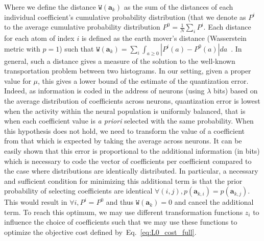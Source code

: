 \documentclass[vision,article,submit,oneauthor,pdftex]{Definitions/mdpi}
\newcommand{\coef}{\mathbf{a}} %
\newcommand{\image}{\mathbf{y}} %
\newcommand{\seeEq}[1]{Eq.~\ref{eq:#1}}%
\begin{document}
{Where we define the distance $\texttt{W}(\coef_{k})$ as the sum of the distances of each individual coefficient's cumulative probability distribution (that we denote as $P^i$ to the average cumulative probability distribution $P^0 = \frac 1 N \sum_i P^i$. Each distance for each atom of index $i$ is defined as the earth mover's distance (Wasserstein metric with $p=1$) such that  $ \texttt{W}(\coef_{k}) = \sum_i \int_{a\geq0} | P^i(a) - P^0(a)| da $~\citep{Vallender74}. In general, such a distance gives a measure of the solution to the well-known transportation problem between two histograms. In our setting, given a proper value for $\mu$, this gives a lower bound of the estimate of the quantization error.  Indeed, as information is coded in the address of neurons (using $\lambda$ bits) based on the average distribution of coefficients across neurons, quantization error is lowest when the activity within the neural population is uniformly balanced, that is when each coefficient value is \emph{a priori} selected with the same probability. When this hypothesis does not hold, we need to transform the value of a coefficient from that which is expected by taking the average across neurons. It can be easily shown that this error is proportional to the additional information (in bits) which is necessary to code the vector of coefficients per coefficient compared to the case where distributions are identically distributed. In particular, a necessary and sufficient condition for minimizing this additional term is that the prior probability of selecting coefficients are identical $\forall (i,j), p(\coef_{k,i})=p(\coef_{k,j})$. This would result in $\forall i, P^i = P^0$ and thus $\texttt{W}(\coef_{k})= 0$ and cancel the additional term. To reach this optimum, we may use different transformation functions $z_i$ to influence the choice of coefficients such that we may use these functions to optimize the objective cost defined by~\seeEq{L0_cost_full}.

}
\end{document}
